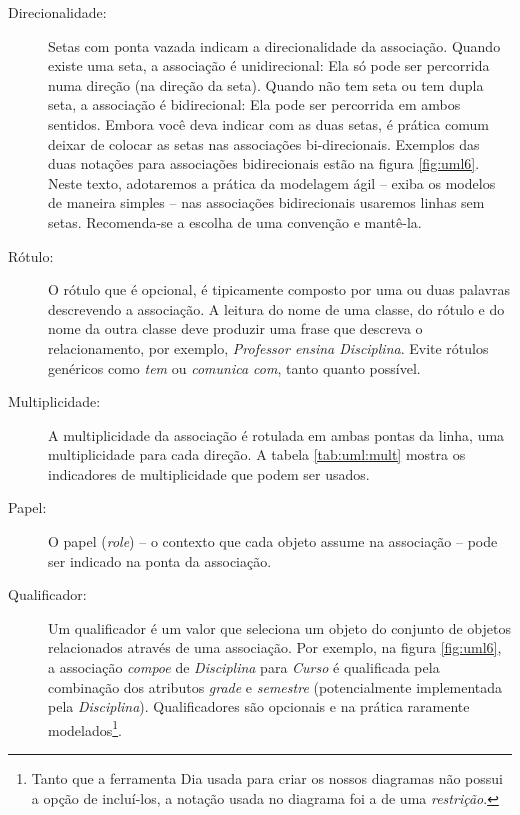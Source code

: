\documentclass[
	article,			%
	12pt,				%
	openright,
	twoside,			%
	a4paper,			%
	english,			%
	french,
	brazil,				%
	sumario=tradicional
	]{abntex2}
\begin{document}
\begin{description}
\item[Direcionalidade:] Setas com ponta vazada indicam a direcionalidade da associação. Quando existe uma seta, a associação é unidirecional: Ela só pode ser percorrida numa direção (na direção da seta). Quando não tem seta ou tem dupla seta, a associação é bidirecional: Ela pode ser percorrida em ambos sentidos. Embora você deva indicar com as duas setas, é prática comum deixar de colocar as setas nas associações bi-direcionais. Exemplos das duas notações para associações bidirecionais estão na figura \ref{fig:uml6}. Neste texto, adotaremos a prática da modelagem ágil -- exiba os modelos de maneira simples -- nas associações bidirecionais usaremos linhas sem setas. Recomenda-se a escolha de uma convenção e mantê-la.

\item[Rótulo:] O rótulo que é opcional, é tipicamente composto por uma ou duas palavras descrevendo a associação. A leitura do nome de uma classe, do rótulo e do nome da outra classe deve produzir uma frase que descreva o relacionamento, por exemplo, \emph{Professor ensina Disciplina}. Evite rótulos genéricos como \textit{tem} ou \textit{comunica com}, tanto quanto possível.

\item[Multiplicidade:] A multiplicidade da associação é rotulada em ambas pontas da linha, uma multiplicidade para cada direção. A tabela \ref{tab:uml:mult} mostra os indicadores de multiplicidade que podem ser usados.

\item[Papel:] O papel (\textit{role}) -- o contexto que cada objeto assume na associação -- pode ser indicado na ponta da associação.

\item[Qualificador:] Um qualificador é um valor que seleciona um objeto do conjunto de objetos relacionados através de uma associação. Por exemplo, na figura \ref{fig:uml6}, a associação \emph{compoe} de \emph{Disciplina} para \emph{Curso} é qualificada pela combinação dos atributos \emph{grade} e \emph{semestre} (potencialmente implementada pela \emph{Disciplina}). Qualificadores são opcionais e na prática raramente modelados\footnote{Tanto que a ferramenta Dia usada para criar os nossos diagramas não possui a opção de incluí-los, a notação usada no diagrama foi a de uma \textit{restrição}.}.

\end{description}
\end{document}
